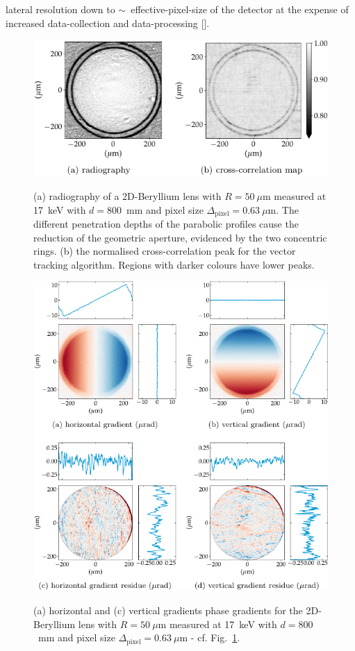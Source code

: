 \begin{refsection}
lateral resolution down to $\sim$~effective-pixel-size of the detector at the expense of increased data-collection and data-processing [\cite{Berujon2016,Berujon2020}].

\begin{figure}[t]
        \centering
        {\includegraphics[width=.5\linewidth]{figures/ch04b/radio_corr_map.pdf}}
        \caption[Normalised cross-correlation map]{(a) radiography of a 2D-Beryllium lens with $R=50~\mu$m measured at 17~keV with $d=800$~mm and pixel size $\Delta_\text{pixel}= 0.63~\mu$m. The different penetration depths of the parabolic profiles cause the reduction of the geometric aperture, evidenced by the two concentric rings. (b) the normalised cross-correlation peak for the vector tracking algorithm. Regions with darker colours have lower peaks.}\label{fig:cross-correlation-map}
\end{figure}

\begin{figure}[t]
        \centering
        {\includegraphics[width=.6\linewidth]{figures/ch04b/gradients.pdf}}
        \caption[Recovered phase gradient and residues]{(a) horizontal and (c) vertical gradients phase gradients for the 2D-Beryllium lens with $R=50~\mu$m measured at 17~keV with $d=800$~mm and pixel size $\Delta_\text{pixel}= 0.63~\mu$m - cf. Fig.~\ref{fig:cross-correlation-map}.}\label{fig:gradients}
\end{figure}


\end{refsection}
